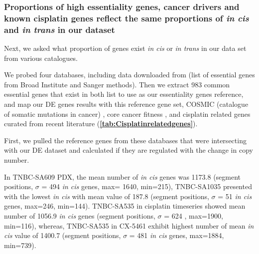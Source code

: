 





\subsubsection{Proportions of high essentiality genes, cancer drivers and known cisplatin genes reflect the same proportions of \textit{in cis} and \textit{in trans} in our dataset}

Next, we asked what proportion of genes exist \textit{in cis} or \textit{in trans} in our data set from various catalogues. 

We probed four databases, including data downloaded from \cite{dempster2019agreement} (list of essential genes from Broad Institute and Sanger methods). Then we extract 983 common essential genes that exist in both list to use as our essentiality genes reference, and map our DE genes results with this reference gene set, COSMIC (catalogue of somatic mutations in cancer) \cite{forbes2010cosmic}, core cancer fitness \cite{behan2019prioritization}, and cisplatin related genes curated from recent literature (\textbf{\autoref{tab:Cisplatinrelatedgenes}}).

First, we pulled the reference genes from these databases that were intersecting with our \ac{DE} dataset and calculated if they are regulated with the change in copy number.

 In TNBC-SA609 PDX, the mean number of \textit{in cis} genes was 1173.8 (segment positions, $\sigma$ = 494 \textit{in cis} genes, max= 1640, min=215), TNBC-SA1035 presented with the lowest \textit{in cis} with
 mean value of 187.8 (segment positions, $\sigma$ = 51 \textit{in cis} genes, max=246, min=144). TNBC-SA535 in cisplatin timeseries showed mean number of 1056.9 \textit{in cis} genes (segment positions, $\sigma$ = 624 , max=1900, min=116), whereas, TNBC-SA535 in CX-5461 exhibit highest number of mean \textit{in cis} value of 1400.7 (segment positions, $\sigma$ = 481 \textit{in cis} genes, max=1884, min=739).
 
